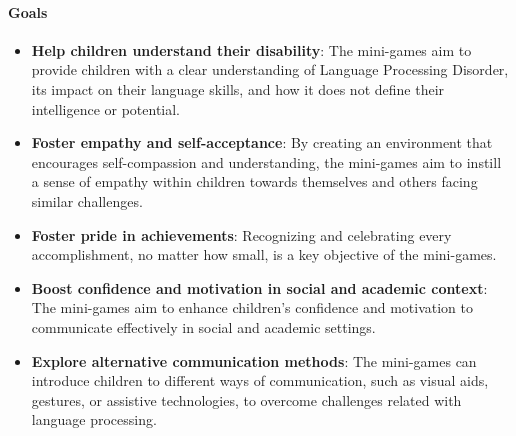 \paragraph{Goals}
\begin{itemize}
    \item \textbf{Help children understand their disability}: The mini-games aim to provide children with a clear understanding of Language Processing Disorder, its impact on their language skills, and how it does not define their intelligence or potential.
    \item \textbf{Foster empathy and self-acceptance}: By creating an environment that encourages self-compassion and understanding, the mini-games aim to instill a sense of empathy within children towards themselves and others facing similar challenges.
    \item \textbf{Foster pride in achievements}: Recognizing and celebrating every accomplishment, no matter how small, is a key objective of the mini-games.
    \item \textbf{Boost confidence and motivation in social and academic context}: The mini-games aim to enhance children's confidence and motivation to communicate effectively in social and academic settings.
    \item \textbf{Explore alternative communication methods}: The mini-games can introduce children to different ways of communication, such as visual aids, gestures, or assistive technologies, to overcome challenges related with language processing.
\end{itemize}

